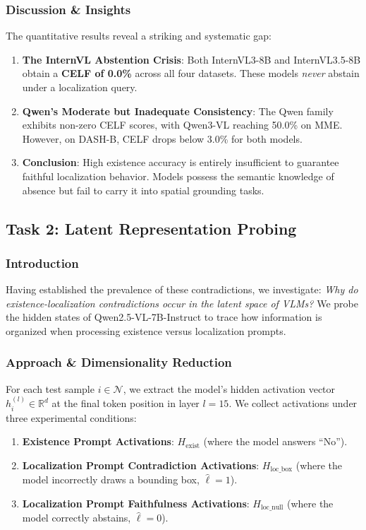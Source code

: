 \documentclass[12pt,a4paper]{article}
\begin{document}
\subsubsection{Discussion \& Insights}
The quantitative results reveal a striking and systematic gap:

\begin{enumerate}[leftmargin=*]
\item \textbf{The InternVL Abstention Crisis}: Both InternVL3-8B and InternVL3.5-8B obtain a \textbf{CELF of 0.0\%} across all four datasets. These models \textit{never} abstain under a localization query.
\item \textbf{Qwen's Moderate but Inadequate Consistency}: The Qwen family exhibits non-zero CELF scores, with Qwen3-VL reaching 50.0\% on MME. However, on DASH-B, CELF drops below 3.0\% for both models.
\item \textbf{Conclusion}: High existence accuracy is entirely insufficient to guarantee faithful localization behavior. Models possess the semantic knowledge of absence but fail to carry it into spatial grounding tasks.
\end{enumerate}

\subsection{Task 2: Latent Representation Probing}

\subsubsection{Introduction}
Having established the prevalence of these contradictions, we investigate: \textit{Why do existence-localization contradictions occur in the latent space of VLMs?} We probe the hidden states of Qwen2.5-VL-7B-Instruct to trace how information is organized when processing existence versus localization prompts.

\subsubsection{Approach \& Dimensionality Reduction}
For each test sample $i \in \mathcal{N}$, we extract the model's hidden activation vector $h^{(l)}_i \in \mathbb{R}^d$ at the final token position in layer $l = 15$. We collect activations under three experimental conditions:

\begin{enumerate}[leftmargin=*]
\item \textbf{Existence Prompt Activations}: $H_{\text{exist}}$ (where the model answers ``No'').
\item \textbf{Localization Prompt Contradiction Activations}: $H_{\text{loc\_box}}$ (where the model incorrectly draws a bounding box, $\hat{\ell} = 1$).
\item \textbf{Localization Prompt Faithfulness Activations}: $H_{\text{loc\_null}}$ (where the model correctly abstains, $\hat{\ell} = 0$).
\end{enumerate}
\end{document}
